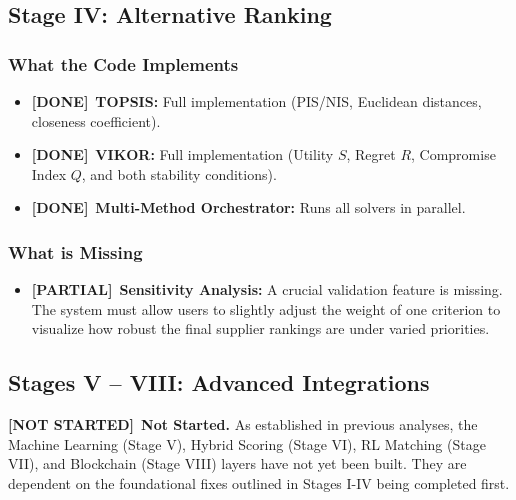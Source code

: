 \documentclass[11pt]{article}
\newcommand{\done}{\textcolor{done}{\textbf{[DONE]}}}
\newcommand{\partial}{\textcolor{partial}{\textbf{[PARTIAL]}}}
\newcommand{\notdone}{\textcolor{notdone}{\textbf{[NOT STARTED]}}}
\begin{document}
\subsection{Stage IV: Alternative Ranking}
\label{sec:stage4}

\subsubsection{What the Code Implements}
\begin{itemize}
    \item \done\ \textbf{TOPSIS:} Full implementation (PIS/NIS, Euclidean distances, closeness coefficient).
    \item \done\ \textbf{VIKOR:} Full implementation (Utility $S$, Regret $R$, Compromise Index $Q$, and both stability conditions).
    \item \done\ \textbf{Multi-Method Orchestrator:} Runs all solvers in parallel.
\end{itemize}

\subsubsection{What is Missing}
\begin{itemize}
    \item \partial\ \textbf{Sensitivity Analysis:} A crucial validation feature is missing. The system must allow users to slightly adjust the weight of one criterion to visualize how robust the final supplier rankings are under varied priorities.
\end{itemize}

\subsection{Stages V -- VIII: Advanced Integrations}
\notdone\ \textbf{Not Started.} 
As established in previous analyses, the Machine Learning (Stage V), Hybrid Scoring (Stage VI), RL Matching (Stage VII), and Blockchain (Stage VIII) layers have not yet been built. They are dependent on the foundational fixes outlined in Stages I-IV being completed first.

\end{document}
